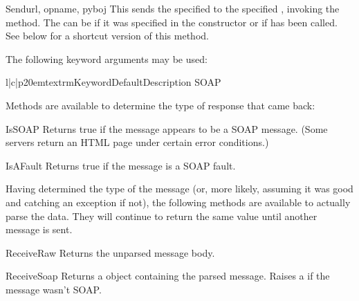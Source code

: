 \begin{methoddesc}{Send}{url, opname, pyboj}
This sends the specified  to the specified , invoking
the  method.
The  can be  if it was specified in the 
constructor or if  has been called.
See below for a shortcut version of this method.

The following keyword arguments may be used:

\begin{tableiii}{l|c|p{20em}}{textrm}{Keyword}{Default}{Description}
    SOAP 
\end{tableiii}

\end{methoddesc}

Methods are available to determine the type of response that came back:

\begin{methoddesc}{IsSOAP}{}
Returns true if the message appears to be a SOAP message.
(Some servers return an HTML page under certain error conditions.)
\end{methoddesc}

\begin{methoddesc}{IsAFault}{}
Returns true if the message is a SOAP fault.
\end{methoddesc}

Having determined the type of the message (or, more likely, assuming
it was good and catching an exception if not), the following methods
are available to actually parse the data.
They will continue to return the same value until
another message is sent.

\begin{methoddesc}{ReceiveRaw}{}
Returns the unparsed message body.
\end{methoddesc}

\begin{methoddesc}{ReceiveSoap}{}
Returns a  object containing the parsed message.
Raises a  if the message wasn't SOAP.
\end{methoddesc}

